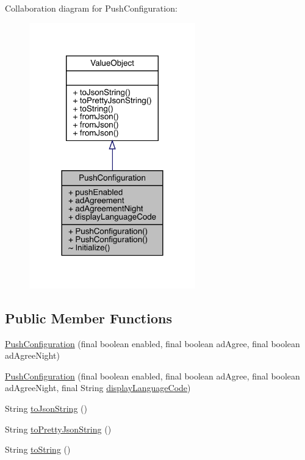 Collaboration diagram for Push\+Configuration\+:\nopagebreak
\begin{figure}[H]
\begin{center}
\leavevmode
\includegraphics[width=204pt]{classcom_1_1toast_1_1android_1_1gamebase_1_1base_1_1push_1_1_push_configuration__coll__graph}
\end{center}
\end{figure}
\subsection*{Public Member Functions}
\begin{DoxyCompactItemize}
\item 
\hyperlink{classcom_1_1toast_1_1android_1_1gamebase_1_1base_1_1push_1_1_push_configuration_a65c00660f0b5bee1e7384ec5c0d78a22}{Push\+Configuration} (final boolean enabled, final boolean ad\+Agree, final boolean ad\+Agree\+Night)
\item 
\hyperlink{classcom_1_1toast_1_1android_1_1gamebase_1_1base_1_1push_1_1_push_configuration_ac58c3be85937226c7a9d50352aedb8f0}{Push\+Configuration} (final boolean enabled, final boolean ad\+Agree, final boolean ad\+Agree\+Night, final String \hyperlink{classcom_1_1toast_1_1android_1_1gamebase_1_1base_1_1push_1_1_push_configuration_a4275e397239a0159905fcc9673788246}{display\+Language\+Code})
\item 
String \hyperlink{classcom_1_1toast_1_1android_1_1gamebase_1_1base_1_1_value_object_a58acf6402880e9769d79d8667581fa6a}{to\+Json\+String} ()
\item 
String \hyperlink{classcom_1_1toast_1_1android_1_1gamebase_1_1base_1_1_value_object_a054431f3d988a22295cfc8b784ff2637}{to\+Pretty\+Json\+String} ()
\item 
String \hyperlink{classcom_1_1toast_1_1android_1_1gamebase_1_1base_1_1_value_object_ad146fa8579a5f8a876c4688cc5a68520}{to\+String} ()
\end{DoxyCompactItemize}
